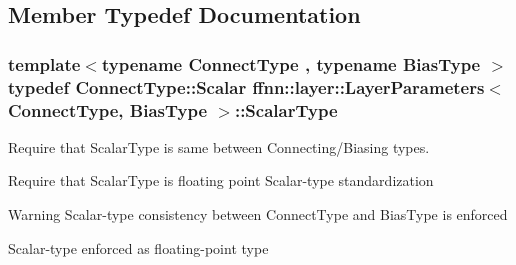 \subsection{Member Typedef Documentation}
\hypertarget{classffnn_1_1layer_1_1_layer_parameters_a3dd1354de05cbf7c05d82a8ed653714e}{
\subsubsection[{Scalar\-Type}]{\setlength{\rightskip}{0pt plus 5cm}template$<$typename Connect\-Type , typename Bias\-Type $>$ typedef Connect\-Type\-::\-Scalar {\bf ffnn\-::layer\-::\-Layer\-Parameters}$<$ Connect\-Type, Bias\-Type $>$\-::{\bf Scalar\-Type}}}\label{classffnn_1_1layer_1_1_layer_parameters_a3dd1354de05cbf7c05d82a8ed653714e}


Require that Scalar\-Type is same between Connecting/\-Biasing types. 

Require that Scalar\-Type is floating point Scalar-\/type standardization \begin{DoxyWarning}{Warning}
Scalar-\/type consistency between Connect\-Type and Bias\-Type is enforced 

Scalar-\/type enforced as floating-\/point type 
\end{DoxyWarning}



